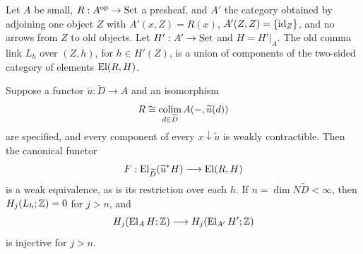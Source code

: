 \begin{proposition}
\label{C:lead7}
Let $A$ be small, $R:A^{\mathrm{op}}\to\mathrm{Set}$ a presheaf, and
$A'$ the category obtained by adjoining one object $Z$ with
$A'(x,Z)=R(x)$, $A'(Z,Z)=\{\operatorname{id}_Z\}$, and no arrows from $Z$ to
old objects. Let $H':A'\to\mathrm{Set}$ and $H=H'|_A$.
The old comma link $L_h$ over $(Z,h)$, for $h\in H'(Z)$, is a
union of components of the two-sided category of elements
$\operatorname{El}(R,H)$.

Suppose a functor $\widetilde u:\widetilde D\to A$ and an
isomorphism
\[
 R\cong\operatorname*{colim}_{d\in\widetilde D}A(-,\widetilde u(d))
\]
are specified, and every component of every
$x\downarrow\widetilde u$ is weakly contractible. Then the
canonical functor
\[
 F:\operatorname{El}_{\widetilde D}(\widetilde u^*H)
       \longrightarrow \operatorname{El}(R,H)
\]
is a weak equivalence, as is its restriction over each $h$.
If $n=\dim N\widetilde D<\infty$, then $H_j(L_h;\mathbb Z)=0$ for
$j>n$, and
\[
 H_j(\operatorname{El}_AH;\mathbb Z)\longrightarrow H_j(\operatorname{El}_{A'}H';\mathbb Z)
\]
is injective for $j>n$.
\end{proposition}
